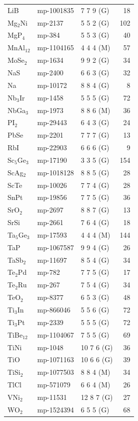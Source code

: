 \begin{longtable}{@{}l l l r@{}}
LiB & mp-1001835 & 7 7 9 (G) & 18 \\
Mg$_{2}$Ni & mp-2137 & 5 5 2 (G) & 102 \\
MgP$_{4}$ & mp-384 & 5 5 3 (G) & 40 \\
MnAl$_{12}$ & mp-1104165 & 4 4 4 (M) & 57 \\
MoSe$_{2}$ & mp-1634 & 9 9 2 (G) & 34 \\
NaS & mp-2400 & 6 6 3 (G) & 32 \\
Na & mp-10172 & 8 8 4 (G) & 8 \\
Nb$_{3}$Ir & mp-1458 & 5 5 5 (G) & 72 \\
NbGa$_{3}$ & mp-1973 & 8 8 6 (M) & 36 \\
PI$_{2}$ & mp-29443 & 6 4 3 (G) & 24 \\
PbSe & mp-2201 & 7 7 7 (G) & 13 \\
RbI & mp-22903 & 6 6 6 (G) & 9 \\
Sc$_{5}$Ge$_{3}$ & mp-17190 & 3 3 5 (G) & 154 \\
ScAg$_{2}$ & mp-1018128 & 8 8 5 (G) & 28 \\
ScTe & mp-10026 & 7 7 4 (G) & 28 \\
SnPt & mp-19856 & 7 7 5 (G) & 36 \\
SrO$_{2}$ & mp-2697 & 8 8 7 (G) & 13 \\
SrSi & mp-2661 & 7 6 4 (G) & 18 \\
Ta$_{5}$Ge$_{3}$ & mp-17593 & 4 4 4 (M) & 144 \\
TaP & mp-1067587 & 9 9 4 (G) & 26 \\
TaSb$_{2}$ & mp-11697 & 8 5 4 (G) & 34 \\
Te$_{2}$Pd & mp-782 & 7 7 5 (G) & 17 \\
Te$_{2}$Ru & mp-267 & 7 5 4 (G) & 34 \\
TeO$_{2}$ & mp-8377 & 6 5 3 (G) & 48 \\
Ti$_{3}$In & mp-866046 & 5 5 6 (G) & 72 \\
Ti$_{3}$Pt & mp-2339 & 5 5 5 (G) & 72 \\
TiBe$_{12}$ & mp-1104067 & 7 5 5 (G) & 69 \\
TiNi & mp-1048 & 10 7 6 (G) & 36 \\
TiO & mp-1071163 & 10 6 6 (G) & 39 \\
TiSi$_{2}$ & mp-1077503 & 8 8 4 (M) & 34 \\
TlCl & mp-571079 & 6 6 4 (M) & 26 \\
VNi$_{2}$ & mp-11531 & 12 8 7 (G) & 27 \\
WO$_{2}$ & mp-1524394 & 6 5 5 (G) & 68 \\

\end{longtable}
